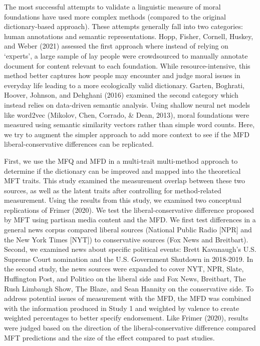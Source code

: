 \documentclass[
  man,floatsintext]{apa6}
\begin{document}
The most successful attempts to validate a linguistic measure of moral
foundations have used more complex methods (compared to the original
dictionary-based approach). These attempts generally fall into two
categories: human annotations and semantic representations. Hopp, Fisher, Cornell, Huskey, and Weber (2021)
assessed the first approach where instead of relying on `experts', a
large sample of lay people were crowdsourced to manually annotate
document for content relevant to each foundation. While
resource-intensive, this method better captures how people may encounter
and judge moral issues in everyday life leading to a more ecologically
valid dictionary. Garten, Boghrati, Hoover, Johnson, and Dehghani (2016) examined the second category which
instead relies on data-driven semantic analysis. Using shallow neural
net models like word2vec (Mikolov, Chen, Corrado, \& Dean, 2013), moral foundations
were measured using semantic similarity vectors rather than simple word
counts. Here, we try to augment the simpler approach to add more context
to see if the MFD liberal-conservative differences can be replicated.

First, we use the MFQ and MFD in a multi-trait multi-method approach to
determine if the dictionary can be improved and mapped into the
theoretical MFT traits. This study examined the measurement overlap
between these two sources, as well as the latent traits after
controlling for method-related measurement. Using the results from this study, we
examined two conceptual replications of Frimer (2020). We test the
liberal-conservative difference proposed by MFT using partisan media
content and the MFD. We first test differences in a general news corpus
compared liberal sources (National Public Radio {[}NPR{]} and the New York
Times {[}NYT{]}) to conservative sources (Fox News and Breitbart). Second,
we examined news about specific political events: Brett Kavanaugh's U.S.
Supreme Court nomination and the U.S. Government Shutdown in 2018-2019.
In the second study, the news sources were expanded to cover NYT, NPR,
Slate, Huffington Post, and Politico on the liberal side and Fox News,
Breitbart, The Rush Limbaugh Show, The Blaze, and Sean Hannity on the
conservative side. To address potential issues of measurement with the
MFD, the MFD was combined with the information produced in Study 1 and
weighted by valence to create weighted percentages to better specify
endorsement. Like Frimer (2020), results were judged based on the
direction of the liberal-conservative difference compared MFT
predictions and the size of the effect compared to past studies.
\end{document}
